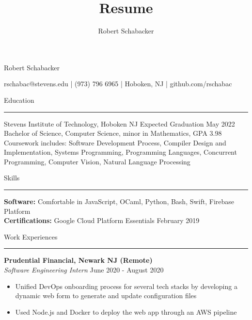 \documentclass{article}
\title{Resume}
\author{Robert Schabacker}
\newcommand \spacingBetweenHeadings {0.5em}
\begin{document}
\begin{center}
{\Huge Robert Schabacker\par}
{\Large rschabac@stevens.edu  |  (973) 796 6965  |  Hoboken, NJ  |  github.com/rschabac\par}
\end{center}
\vspace{-0.7em}
\vspace{\spacingBetweenHeadings}

\noindent
\huge Education\par
\vspace{0.1em}
\hrule
\Large
\vspace{1em}
\noindent
Stevens Institute of Technology, Hoboken NJ
\hfill
Expected Graduation May 2022\\
Bachelor of Science, Computer Science, minor in Mathematics, GPA 3.98\\
Coursework includes: Software Development Process, Compiler Design and Implementation, Systems Programming, Programming Languages, Concurrent Programming, Computer Vision, Natural Language Processing

\vspace{\spacingBetweenHeadings}

\noindent
\huge Skills\par
\vspace{0.1em}
\hrule
\Large
\vspace{1em}
\noindent
\textbf{Software:} Comfortable in JavaScript, OCaml, Python, Bash, Swift, Firebase Platform\\
\textbf{Certifications:} Google Cloud Platform Essentials
\hfill
February 2019

\vspace{\spacingBetweenHeadings}

\noindent
\huge Work Experiences\par
\vspace{0.1em}
\hrule
\Large
\vspace{1em}
\noindent
\textbf{Prudential Financial, Newark NJ (Remote)}\\
\textit{Software Engineering Intern}
\hfill
June 2020 - August 2020\\
\vspace{-1em}
\begin{itemize}
\item Unified DevOps onboarding process for several tech stacks by developing a dynamic web form to generate and update configuration files
\item Used Node.js and Docker to deploy the web app through an AWS pipeline
\end{itemize}
\end{document}
